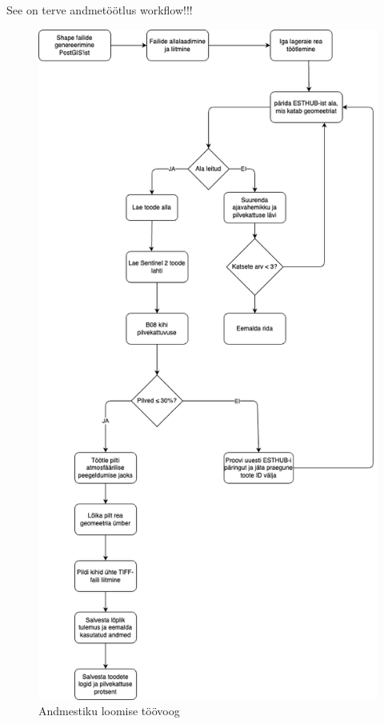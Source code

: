 See on terve andmetöötlus workflow!!!
\begin{figure}[H]
    \centering
    \includegraphics[width=.8\textwidth]{figures/andmestik/andmete_voog.drawio.png}
    \caption{Andmestiku loomise töövoog}
    \label{fig:terveflow}
\end{figure}

